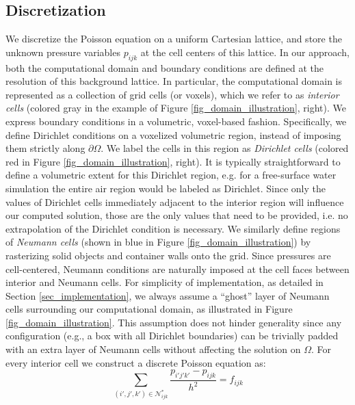 \subsection{Discretization}
\label{sec_discretization}
We discretize the Poisson equation on a uniform Cartesian lattice, and store the unknown pressure variables $p_{ijk}$ at the cell centers of this lattice. In our approach, both the computational
domain and boundary conditions are defined at the resolution of this background lattice. In particular, the computational domain is represented as a collection of grid cells
(or voxels), which we refer to as \emph{interior cells} (colored gray in the example of Figure \ref{fig_domain_illustration}, right).
We express boundary conditions in a volumetric, voxel-based fashion. Specifically, we define Dirichlet conditions on a voxelized volumetric region, instead of imposing them strictly
along $\partial\Omega$. We label the cells in this region as \emph{Dirichlet cells} (colored red in Figure \ref{fig_domain_illustration}, right).
It is typically straightforward to define a volumetric extent for this Dirichlet region, e.g. for a free-surface water simulation the entire air region would be labeled as Dirichlet. Since only the values of Dirichlet
cells immediately adjacent to the interior region will influence our computed solution, those are the only values that need to be provided, i.e. no extrapolation of the Dirichlet
condition is necessary.
We similarly define regions of \emph{Neumann cells} (shown in blue in Figure \ref{fig_domain_illustration}) by rasterizing solid objects and container walls onto
the grid. Since pressures are cell-centered, Neumann conditions are naturally imposed at the cell faces between interior and Neumann cells. For simplicity of implementation, as
detailed in Section \ref{sec_implementation}, we always assume a ``ghost'' layer of Neumann cells surrounding our computational domain, as illustrated in Figure
\ref{fig_domain_illustration}. This assumption does not hinder generality since any configuration (e.g., a box with all Dirichlet boundaries) can be trivially padded with an extra layer of
Neumann cells without affecting the solution on $\Omega$.
For every interior cell we construct a discrete Poisson equation as:
\begin{equation}
\sum_{(i'\!,j'\!,k')\in\mathcal{N}^{\ast}_{ijk}}\!\!\!\!\!\!\!\!\frac{p_{i'\!j'\!k'}-p_{ijk}}{h^2}=f_{ijk}
\label{eqn_discrete_poisson}
\end{equation}
